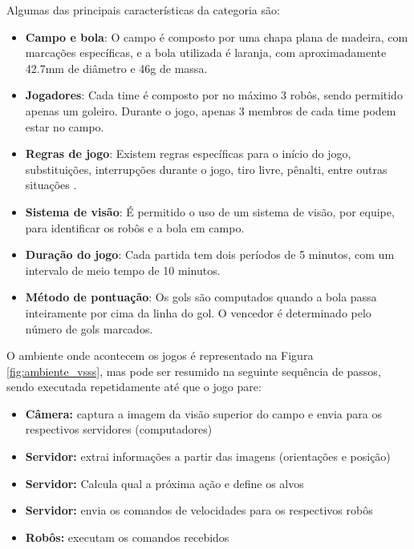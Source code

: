 Algumas das principais características da categoria são:

\begin{itemize}
    \item \textbf{Campo e bola}: O campo é composto por uma chapa plana de madeira, com marcações específicas, e a bola utilizada é laranja, com aproximadamente 42.7mm de diâmetro e 46g de massa.
    
    \item \textbf{Jogadores}: Cada time é composto por no máximo 3 robôs, sendo permitido apenas um goleiro. Durante o jogo, apenas 3 membros de cada time podem estar no campo.
    
    \item \textbf{Regras de jogo}: Existem regras específicas para o início do jogo, substituições, interrupções durante o jogo, tiro livre, pênalti, entre outras situações \cite{regras_vss2023}.
    
    \item \textbf{Sistema de visão}: É permitido o uso de um sistema de visão, por equipe, para identificar os robôs e a bola em campo.
    
    \item \textbf{Duração do jogo}: Cada partida tem dois períodos de 5 minutos, com um intervalo de meio tempo de 10 minutos.
    
    \item \textbf{Método de pontuação}: Os gols são computados quando a bola passa inteiramente por cima da linha do gol. O vencedor é determinado pelo número de gols marcados.
\end{itemize}


O ambiente onde acontecem os jogos é representado na Figura \ref{fig:ambiente_vsss}, mas pode ser resumido na seguinte sequência de passos, sendo executada repetidamente até que o jogo pare:

\begin{itemize}
    \item \textbf{Câmera:} captura a imagem da visão superior do campo e envia para os respectivos servidores (computadores)
    
    \item \textbf{Servidor:} extrai informações a partir das imagens (orientações e posição)
    
    \item \textbf{Servidor:} Calcula qual a próxima ação e define os alvos
    
    \item \textbf{Servidor:} envia os comandos de velocidades para os respectivos robôs

    \item \textbf{Robôs:} executam os comandos recebidos
\end{itemize}


